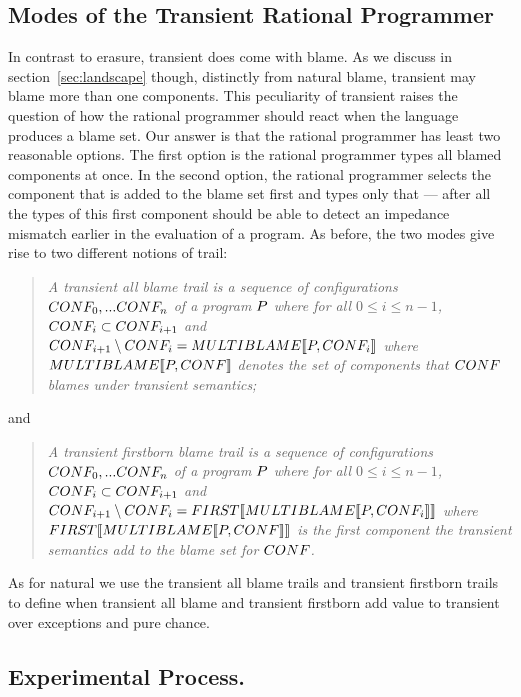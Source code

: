 \subsection{Modes of the Transient Rational Programmer} \label{sub:transient}

In contrast to erasure, transient does come with blame. As we discuss in
section~\ref{sec:landscape} though, distinctly from natural blame,
transient may blame more than one components. This peculiarity of 
transient raises the question of how the rational programmer should react
when the language produces a blame set. Our answer is that the rational
programmer has least two reasonable options.  The first option is the rational programmer types
all blamed components at once.  In the second option, the rational
programmer selects the component that is added to the blame set first and types
only that --- after all the types of this first component should be able
to  detect an impedance mismatch earlier in the evaluation of a program. 
As before, the two modes give rise to two different notions of trail:
\begin{quote}
\it 
A  transient all blame trail
is a sequence of configurations $CONF_0,...CONF_n$ of a program
$P$ where for all $0 \leq i \leq n - 1$, $CONF_i \subset CONF_{i+1}$ and
~$CONF_{i+1} \setminus CONF_i = MULTIBLAME\llbracket P, CONF_i\rrbracket$
where $MULTIBLAME\llbracket P, CONF\rrbracket$ denotes the set of components that $CONF$
blames under transient semantics; 
\end{quote}
\noindent
and
\begin{quote}
\it 
A transient firstborn blame trail
is a sequence of configurations $CONF_0,...CONF_n$ of a program
$P$ where for all $0 \leq i \leq n - 1$, $CONF_i \subset CONF_{i+1}$ and
  $CONF_{i+1} \setminus CONF_i = FIRST\llbracket MULTIBLAME\llbracket P, CONF_i\rrbracket\rrbracket$
  where $FIRST\llbracket MULTIBLAME\llbracket P, CONF\rrbracket\rrbracket$ is the first component 
  the transient semantics add to the blame set for $CONF$.
\end{quote}
\noindent As for natural we use the transient all blame trails and 
transient firstborn  trails to define when  transient all blame and 
transient firstborn add value to transient over exceptions and pure
chance. 

\subsection{Experimental Process.}

